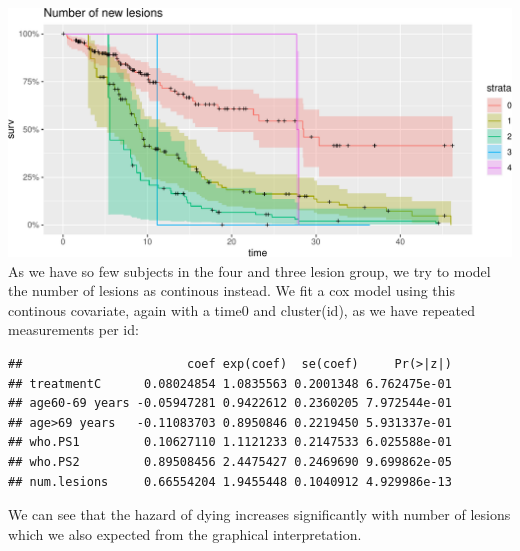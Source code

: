 \documentclass[
  11pt,
]{article}
\newenvironment{Shaded}{\begin{snugshade}}{\end{snugshade}}
\newcommand{\AttributeTok}[1]{\textcolor[rgb]{0.77,0.63,0.00}{#1}}
\newcommand{\DecValTok}[1]{\textcolor[rgb]{0.00,0.00,0.81}{#1}}
\newcommand{\FloatTok}[1]{\textcolor[rgb]{0.00,0.00,0.81}{#1}}
\newcommand{\FunctionTok}[1]{\textcolor[rgb]{0.00,0.00,0.00}{#1}}
\newcommand{\NormalTok}[1]{#1}
\newcommand{\OtherTok}[1]{\textcolor[rgb]{0.56,0.35,0.01}{#1}}
\newcommand{\SpecialCharTok}[1]{\textcolor[rgb]{0.00,0.00,0.00}{#1}}
\begin{document}
\includegraphics{Exam2021_files/figure-latex/unnamed-chunk-12-1.pdf} As
we have so few subjects in the four and three lesion group, we try to
model the number of lesions as continous instead. We fit a cox model
using this continous covariate, again with a time0 and cluster(id), as
we have repeated measurements per id:

\begin{Shaded}
\end{Shaded}

\begin{verbatim}
##                       coef exp(coef)  se(coef)     Pr(>|z|)
## treatmentC      0.08024854 1.0835563 0.2001348 6.762475e-01
## age60-69 years -0.05947281 0.9422612 0.2360205 7.972544e-01
## age>69 years   -0.11083703 0.8950846 0.2219450 5.931337e-01
## who.PS1         0.10627110 1.1121233 0.2147533 6.025588e-01
## who.PS2         0.89508456 2.4475427 0.2469690 9.699862e-05
## num.lesions     0.66554204 1.9455448 0.1040912 4.929986e-13
\end{verbatim}

We can see that the hazard of dying increases significantly with number
of lesions which we also expected from the graphical interpretation.
\end{document}
